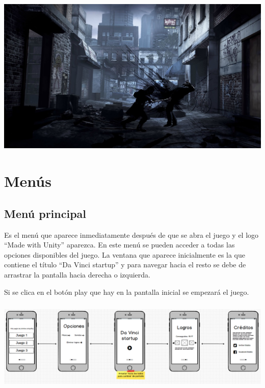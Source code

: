  \includegraphics[width=5.30458in,height=2.98414in]{anexos/GDD/GDD-img001.jpg} 

\section[Men\'us]{ Men\'us}
\hypertarget{Toc484614215}{}\subsection[Men\'u principal]{ Men\'u principal}
\hypertarget{Toc484614216}{}{
Es el men\'u que aparece inmediatamente despu\'es de que se abra el juego y el logo ``Made with Unity'' aparezca. En
este men\'u se pueden acceder a todas las opciones disponibles del juego. La ventana que aparece inicialmente es la que
contiene el t\'itulo ``Da Vinci startup'' y para navegar hacia el resto se debe de arrastrar la pantalla hacia derecha
o izquierda.\ }

{
Si se clica en el bot\'on play que hay en la pantalla inicial se empezar\'a el juego.}


\bigskip

{
 \includegraphics[width=5.90556in,height=1.73542in]{anexos/GDD/GDD-img002.png} \foreignlanguage{spanish}{\ \ }}

